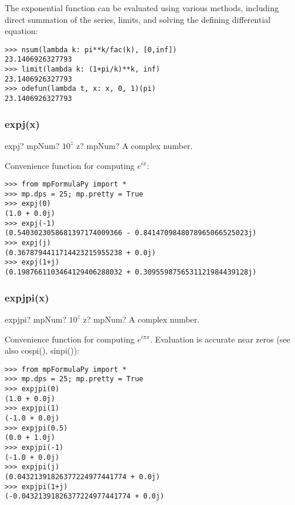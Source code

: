 The exponential function can be evaluated using various methods, including direct
summation of the series, limits, and solving the defining differential equation:
\begin{lstlisting}
>>> nsum(lambda k: pi**k/fac(k), [0,inf])
23.1406926327793
>>> limit(lambda k: (1+pi/k)**k, inf)
23.1406926327793
>>> odefun(lambda t, x: x, 0, 1)(pi)
23.1406926327793
\end{lstlisting}




\subsubsection{expj(x)}

\begin{mpFunctionsExtract}
	\mpFunctionOne
	{expj? mpNum?  $10^z$}
	{z? mpNum? A complex number.}
\end{mpFunctionsExtract}


Convenience function for computing $e^{ix}$:
\begin{lstlisting}
>>> from mpFormulaPy import *
>>> mp.dps = 25; mp.pretty = True
>>> expj(0)
(1.0 + 0.0j)
>>> expj(-1)
(0.5403023058681397174009366 - 0.8414709848078965066525023j)
>>> expj(j)
(0.3678794411714423215955238 + 0.0j)
>>> expj(1+j)
(0.1987661103464129406288032 + 0.3095598756531121984439128j)
\end{lstlisting}



\subsubsection{expjpi(x)}


\begin{mpFunctionsExtract}
	\mpFunctionOne
	{expjpi? mpNum?  $10^z$}
	{z? mpNum? A complex number.}
\end{mpFunctionsExtract}


Convenience function for computing $e^{i \pi x}$. Evaluation is accurate near zeros (see also cospi(), sinpi()):
\begin{lstlisting}
>>> from mpFormulaPy import *
>>> mp.dps = 25; mp.pretty = True
>>> expjpi(0)
(1.0 + 0.0j)
>>> expjpi(1)
(-1.0 + 0.0j)
>>> expjpi(0.5)
(0.0 + 1.0j)
>>> expjpi(-1)
(-1.0 + 0.0j)
>>> expjpi(j)
(0.04321391826377224977441774 + 0.0j)
>>> expjpi(1+j)
(-0.04321391826377224977441774 + 0.0j)
\end{lstlisting}



